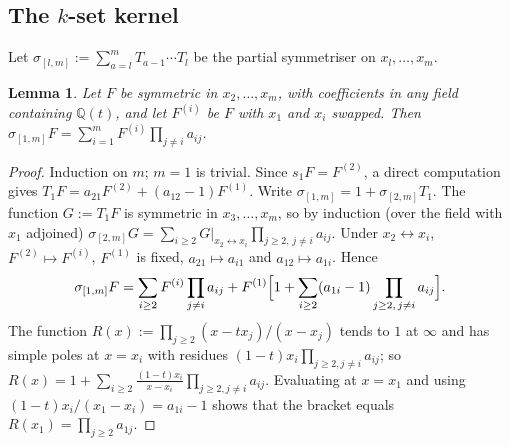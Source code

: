 \documentclass[11pt]{amsart}
\newtheorem{lemma}[theorem]{Lemma}
\theoremstyle{definition}
\theoremstyle{remark}
\numberwithin{equation}{section}
\begin{document}
\subsection{The $k$-set kernel}
Let $\sigma_{[l,m]}:=\sum_{a=l}^mT_{a-1}\cdots T_l$ be the partial symmetriser on $x_l,\dots,x_m$.

\begin{lemma}\label{lem:sym1}
Let $F$ be symmetric in $x_2,\dots,x_m$, with coefficients in any field containing $\mathbb{Q}(t)$, and let $F^{(i)}$ be $F$ with $x_1$ and $x_i$ swapped. Then $\sigma_{[1,m]}F=\sum_{i=1}^mF^{(i)}\prod_{j\neq i}a_{ij}$.
\end{lemma}
\begin{proof}
Induction on $m$; $m=1$ is trivial. Since $s_1F=F^{(2)}$, a direct computation gives $T_1F=a_{21}F^{(2)}+(a_{12}-1)F^{(1)}$. Write $\sigma_{[1,m]}=1+\sigma_{[2,m]}T_1$. The function $G:=T_1F$ is symmetric in $x_3,\dots,x_m$, so by induction (over the field with $x_1$ adjoined) $\sigma_{[2,m]}G=\sum_{i\ge2}G|_{x_2\leftrightarrow x_i}\prod_{j\ge2,\,j\neq i}a_{ij}$. Under $x_2\leftrightarrow x_i$, $F^{(2)}\mapsto F^{(i)}$, $F^{(1)}$ is fixed, $a_{21}\mapsto a_{i1}$ and $a_{12}\mapsto a_{1i}$. Hence
\[ \sigma_{[1,m]}F=\sum_{i\ge2}F^{(i)}\prod_{j\neq i}a_{ij}+F^{(1)}\Bigl[1+\sum_{i\ge2}(a_{1i}-1)\prod_{j\ge2,\,j\neq i}a_{ij}\Bigr]. \]
The function $R(x):=\prod_{j\ge2}(x-tx_j)/(x-x_j)$ tends to $1$ at $\infty$ and has simple poles at $x=x_i$ with residues $(1-t)x_i\prod_{j\ge2,j\neq i}a_{ij}$; so $R(x)=1+\sum_{i\ge2}\frac{(1-t)x_i}{x-x_i}\prod_{j\ge2,j\ne i}a_{ij}$. Evaluating at $x=x_1$ and using $(1-t)x_i/(x_1-x_i)=a_{1i}-1$ shows that the bracket equals $R(x_1)=\prod_{j\ge2}a_{1j}$.
\end{proof}
\end{document}
